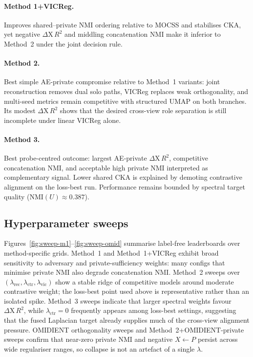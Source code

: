 \paragraph{Method 1+VICReg.}
Improves shared--private NMI ordering relative to MOCSS and stabilises CKA, yet negative $\Delta\mathrm{X}\,R^{2}$ and middling concatenation NMI make it inferior to Method~2 under the joint decision rule.

\paragraph{Method 2.}
Best simple AE-private compromise relative to Method~1 variants: joint reconstruction removes dual solo paths, VICReg replaces weak orthogonality, and multi-seed metrics remain competitive with structured UMAP on both branches. Its modest $\Delta\mathrm{X}\,R^{2}$ shows that the desired cross-view role separation is still incomplete under linear VICReg alone.

\paragraph{Method 3.}
Best probe-centred outcome: largest AE-private $\Delta\mathrm{X}\,R^{2}$, competitive concatenation NMI, and acceptable high private NMI interpreted as complementary signal. Lower shared CKA is explained by demoting contrastive alignment on the loss-best run. Performance remains bounded by spectral target quality ($\mathrm{NMI}(U)\approx0.387$).

\subsection{Hyperparameter sweeps}

Figures~\ref{fig:sweep-m1}--\ref{fig:sweep-omid} summarise label-free leaderboards over method-specific grids. Method~1 and Method~1+VICReg exhibit broad sensitivity to adversary and private-sufficiency weights: many configs that minimise private NMI also degrade concatenation NMI. Method~2 sweeps over $(\lambda_{\mathrm{rec}},\lambda_{\mathrm{ctr}},\lambda_{\mathrm{vic}})$ show a stable ridge of competitive models around moderate contrastive weight; the loss-best point used above is representative rather than an isolated spike. Method~3 sweeps indicate that larger spectral weights favour $\Delta\mathrm{X}\,R^{2}$, while $\lambda_{\mathrm{ctr}}=0$ frequently appears among loss-best settings, suggesting that the fused Laplacian target already supplies much of the cross-view alignment pressure. OMIDIENT orthogonality sweeps and Method~2+OMIDIENT-private sweeps confirm that near-zero private NMI and negative $X\leftarrow P$ persist across wide regulariser ranges, so collapse is not an artefact of a single $\lambda$.

